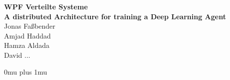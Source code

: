\documentclass[12pt, twoside]{article}
\begin{document}
\begin{titlepage}
	\begin{center}
		{\Huge{\textbf{WPF Verteilte Systeme}}} \\
	\vspace{3cm}
		{\Huge{\textbf{A distributed Architecture for training
      a Deep Learning Agent}}} \\
	\vspace{2cm}
		\huge{Jonas Fa{\ss}bender} \\
	\vspace{.5cm}
		\huge{Amjad Haddad} \\
	\vspace{.5cm}
		\huge{Hamza Aldada} \\
	\vspace{.5cm}
		\huge{David ...}
	\end{center}
%
%
%
%
%
%
%
%
%
%
%
%
%
%
%
%
%
\end{titlepage}

\tableofcontents
\newpage
\listoffigures





\Urlmuskip 0mu plus 1mu\relax

\end{document}
